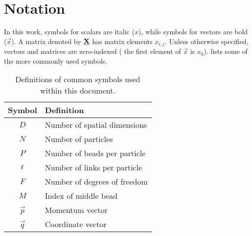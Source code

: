 \chapter{Notation}

In this work, symbols for scalars are italic ($x$), while symbols for vectors are bold ($\vec{x}$).
A matrix denoted by $\underline{\bm{\mathbf{X}}}$ has matrix elements $x_{i,j}$.
Unless otherwise specified, vectors and matrices are zero-indexed (\ie{} the first element of $\vec{x}$ is $x_0$).
 lists some of the more commonly used symbols.

\begin{table}[h]
	\renewcommand*\arraystretch{1.2}
	\begin{center}
	\begin{tabular}{ c l }
		\toprule
		Symbol & Definition \\
		\midrule
		$D$ & Number of spatial dimensions \\
		$N$ & Number of particles \\
		$P$ & Number of beads per particle \\
		$\ell$ & Number of links per particle \\
		$F$ & Number of degrees of freedom \\
		$M$ & Index of middle bead \\
		$\vec{p}$ & Momentum vector \\
		$\vec{q}$ & Coordinate vector \\
		\bottomrule
	\end{tabular}
	\end{center}
	\caption[
		Definitions of common symbols
	]{
		Definitions of common symbols used within this document.
	}
	\label{tab:symbols}
\end{table}

